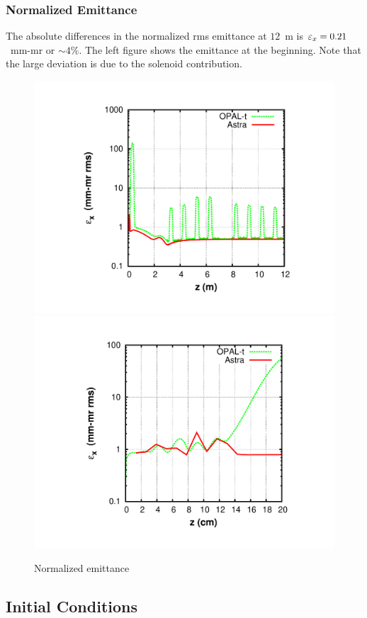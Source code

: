 \documentclass{psi-note}    %
\begin{document}
\subsubsection{Normalized Emittance}

The absolute differences in the normalized rms emittance at $12$~m is $\eps_x =
0.21$~mm-mr or $\sim 4$\%. The left figure shows the emittance at
the beginning. Note that the large deviation is due to the solenoid contribution.
\begin{figure}[htbp]
\begin{center}
\includegraphics[width=.49\linewidth,angle=0]{figures/opal-astra-exrms-1}
\includegraphics[width=.49\linewidth,angle=0]{figures/opal-astra-exrms-2}

\caption{Normalized emittance}
\label{fig:opal-astra-exrms-1}
\end{center}
\end{figure}

\clearpage
\subsection{Initial Conditions}
\end{document}

